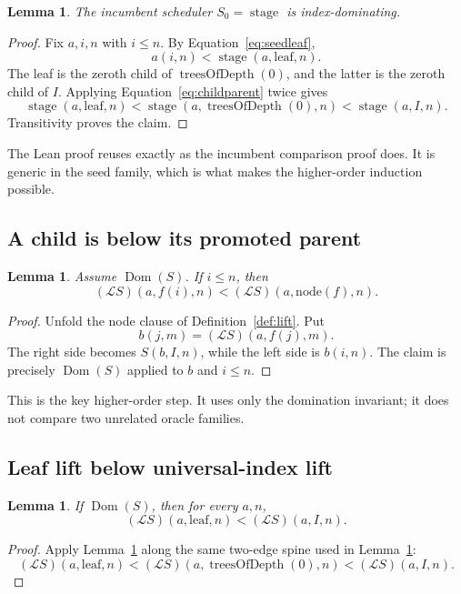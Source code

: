 \documentclass[11pt]{article}
\newtheorem{lemma}[theorem]{Lemma}
\theoremstyle{definition}
\theoremstyle{remark}
\newcommand{\Lift}{\mathcal L}
\newcommand{\Idx}{I}
\newcommand{\lean}[1]{\texttt{\detokenize{#1}}}
\begin{document}
\begin{lemma}\label{lem:base}
The incumbent scheduler \(S_0=\operatorname{stage}\) is index-dominating.
\end{lemma}
\begin{proof}
Fix \(a,i,n\) with \(i\le n\).  By Equation~\eqref{eq:seedleaf},
\[
 a(i,n)<\operatorname{stage}(a,\mathrm{leaf},n).
\]
The leaf is the zeroth child of \(\operatorname{treesOfDepth}(0)\), and the
latter is the zeroth child of \(\Idx\).  Applying
Equation~\eqref{eq:childparent} twice gives
\[
 \operatorname{stage}(a,\mathrm{leaf},n)
 <\operatorname{stage}(a,\operatorname{treesOfDepth}(0),n)
 <\operatorname{stage}(a,\Idx,n).
\]
Transitivity proves the claim.
\end{proof}

The Lean proof reuses \lean{first_tree_leaf} exactly as the incumbent comparison
proof does.  It is generic in the seed family, which is what makes the
higher-order induction possible.

\subsection{A child is below its promoted parent}

\begin{lemma}\label{lem:child}
Assume \(\operatorname{Dom}(S)\).  If \(i\le n\), then
\[
 (\Lift S)(a,f(i),n)<(\Lift S)(a,\mathrm{node}(f),n).
\]
\end{lemma}
\begin{proof}
Unfold the node clause of Definition~\ref{def:lift}.  Put
\[
 b(j,m)=(\Lift S)(a,f(j),m).
\]
The right side becomes \(S(b,\Idx,n)\), while the left side is \(b(i,n)\).
The claim is precisely \(\operatorname{Dom}(S)\) applied to \(b\) and
\(i\le n\).
\end{proof}

This is the key higher-order step.  It uses only the domination invariant; it
does not compare two unrelated oracle families.

\subsection{Leaf lift below universal-index lift}

\begin{lemma}\label{lem:leafindex}
If \(\operatorname{Dom}(S)\), then for every \(a,n\),
\[
 (\Lift S)(a,\mathrm{leaf},n)<(\Lift S)(a,\Idx,n).
\]
\end{lemma}
\begin{proof}
Apply Lemma~\ref{lem:child} along the same two-edge spine used in
Lemma~\ref{lem:base}:
\[
 (\Lift S)(a,\mathrm{leaf},n)
 <(\Lift S)(a,\operatorname{treesOfDepth}(0),n)
 <(\Lift S)(a,\Idx,n).
\]
\end{proof}
\end{document}
